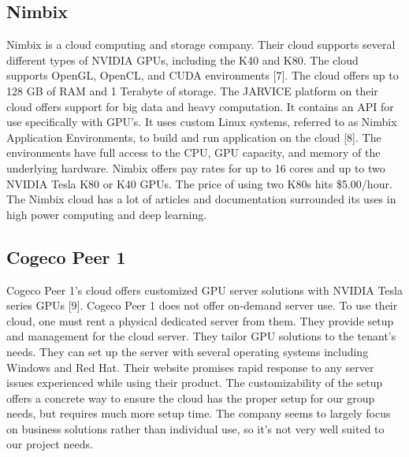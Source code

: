 \documentclass{scrreprt}
\begin{document}
\subsection{Nimbix}
Nimbix is a cloud computing and storage company. 
Their cloud supports several different types of NVIDIA GPUs, including the K40 and K80. 
The cloud supports OpenGL, OpenCL, and CUDA environments [7]. 
The cloud offers up to 128 GB of RAM and 1 Terabyte of storage. 
The JARVICE platform on their cloud offers support for big data and heavy computation. 
It contains an API for use specifically with GPU’s. 
It uses custom Linux systems, referred to as Nimbix Application Environments, to build and run application on the cloud [8]. 
The environments have full access to the CPU, GPU capacity, and memory of the underlying hardware. 
Nimbix offers pay rates for up to 16 cores and up to two NVIDIA Tesla K80 or K40 GPUs. 
The price of using two K80s hits \$5.00/hour. 
The Nimbix cloud has a lot of articles and documentation surrounded its uses in high power computing and deep learning.

\subsection{Cogeco Peer 1}
Cogeco Peer 1’s cloud offers customized GPU server solutions with NVIDIA Tesla series GPUs [9]. 
Cogeco Peer 1 does not offer on-demand server use. 
To use their cloud, one must rent a physical dedicated server from them. 
They provide setup and management for the cloud server.
They tailor GPU solutions to the tenant’s needs. 
They can set up the server with several operating systems including Windows and Red Hat. 
Their website promises rapid response to any server issues experienced while using their product. 
The customizability of the setup offers a concrete way to ensure the cloud has the proper setup for our group needs, but requires much more setup time. 
The company seems to largely focus on business solutions rather than individual use, so it’s not very well suited to our project needs.
\end{document}
